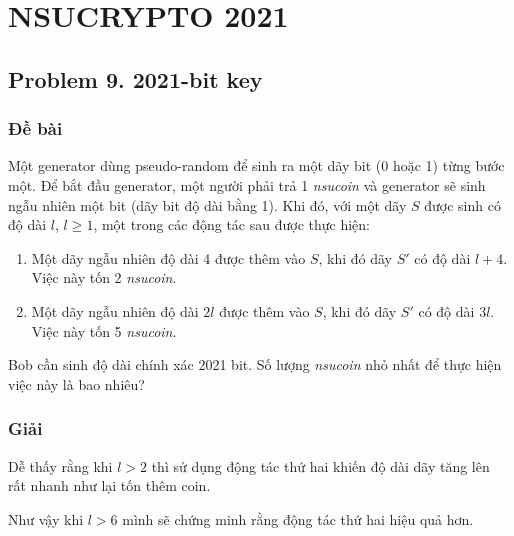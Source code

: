 \chapter*{NSUCRYPTO 2021}

\section*{Problem 9. 2021-bit key}

\subsection*{Đề bài}

Một generator dùng pseudo-random để sinh ra một dãy bit (0 hoặc 1) từng bước một. Để bắt đầu generator, một người phải trả 1 \textit{nsucoin} và generator sẽ sinh ngẫu nhiên một bit (dãy bit độ dài bằng 1). Khi đó, với một dãy $S$ được sinh có độ dài $l$, $l \geqslant 1$, một trong các động tác sau được thực hiện:

\begin{enumerate}
    \item Một dãy ngẫu nhiên độ dài 4 được thêm vào $S$, khi đó dãy $S'$ có độ dài $l + 4$. Việc này tốn 2 \textit{nsucoin}.
    \item Một dãy ngẫu nhiên độ dài $2l$ được thêm vào $S$, khi đó dãy $S'$ có độ dài $3l$. Việc này tốn 5 \textit{nsucoin}.
\end{enumerate}

Bob cần sinh độ dài chính xác 2021 bit. Số lượng \textit{nsucoin} nhỏ nhất để thực hiện việc này là bao nhiêu?

\subsection*{Giải}

Dễ thấy rằng khi $l > 2$ thì sử dụng động tác thứ hai khiến độ dài dãy tăng lên rất nhanh như lại tốn thêm coin.

Như vậy khi $l > 6$ mình sẽ chứng minh rằng động tác thứ hai hiệu quả hơn.

